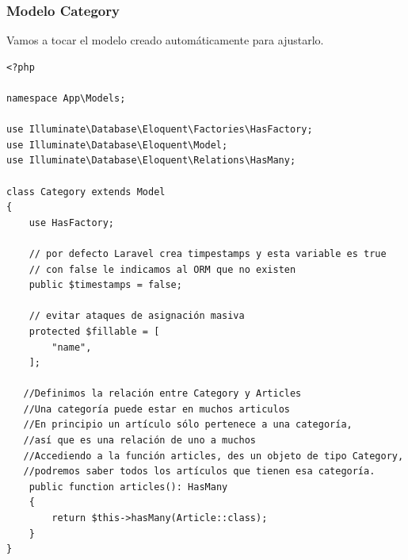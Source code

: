 \documentclass[11pt]{article}
\begin{document}
\subsubsection{Modelo Category}
\label{sec:org8d742bd}
Vamos a tocar el modelo creado automáticamente para ajustarlo.
\begin{verbatim}
<?php

namespace App\Models;

use Illuminate\Database\Eloquent\Factories\HasFactory;
use Illuminate\Database\Eloquent\Model;
use Illuminate\Database\Eloquent\Relations\HasMany;

class Category extends Model
{
    use HasFactory;

    // por defecto Laravel crea timpestamps y esta variable es true
    // con false le indicamos al ORM que no existen
    public $timestamps = false;

    // evitar ataques de asignación masiva
    protected $fillable = [
        "name",
    ];

   //Definimos la relación entre Category y Articles
   //Una categoría puede estar en muchos articulos
   //En principio un artículo sólo pertenece a una categoría,
   //así que es una relación de uno a muchos
   //Accediendo a la función articles, des un objeto de tipo Category,
   //podremos saber todos los artículos que tienen esa categoría.
    public function articles(): HasMany
    {
        return $this->hasMany(Article::class);
    }
}
\end{verbatim}

\newpage
\end{document}
